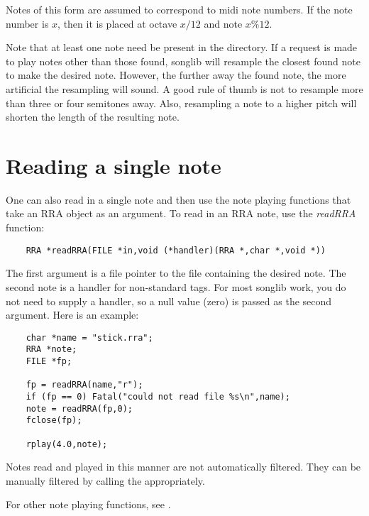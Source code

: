 \documentclass{article}
\begin{document}
Notes of this form are assumed to correspond to midi note numbers.
If the note number is $x$, then it is placed at octave $x / 12$ and note
$x \% 12$.

Note that at least one note need be present in the directory.
If a request is made to play notes other than those found,
songlib will resample the closest found note to make the
desired note. However, the further away the found note,
the more artificial the resampling will sound. A good
rule of thumb is not to resample more than three or four
semitones away. Also, resampling a note to a higher pitch
will shorten the length of the resulting note.

\section{Reading a single note}

One can also read in a single note and then use the
note playing functions that take an RRA object as
an argument. To read in an RRA note, use the
{\it readRRA} function:

\begin{verbatim}
    RRA *readRRA(FILE *in,void (*handler)(RRA *,char *,void *))
\end{verbatim}

The first argument is a file pointer to the file containing the
desired note. The second note is a handler for non-standard tags.
For most songlib work, you do not need to supply a handler, so
a null value (zero) is passed as the second argument. Here
is an example:

\begin{verbatim}
    char *name = "stick.rra";
    RRA *note;
    FILE *fp;

    fp = readRRA(name,"r");
    if (fp == 0) Fatal("could not read file %s\n",name);
    note = readRRA(fp,0);
    fclose(fp);

    rplay(4.0,note);
\end{verbatim}

Notes read and played in this manner are not automatically
filtered. They can be manually filtered by calling the
 appropriately.

For other note playing functions, see .
\end{document}
